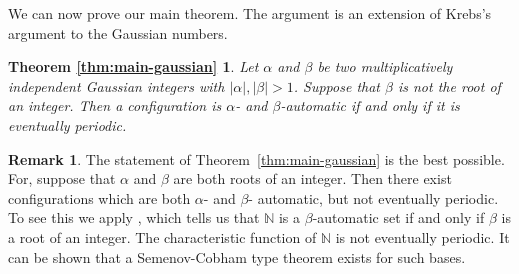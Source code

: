 \documentclass{amsart}
\newtheorem*{main theorem}{Theorem \ref{thm:main-gaussian}}
\theoremstyle{definition}
\newtheorem{remark}[theorem]{Remark}
\begin{document}
We can now prove our main theorem. The argument is an  extension of Krebs's argument \cite{Krebs} to the Gaussian numbers.
\begin{main theorem}
Let $\alpha$ and $\beta$ be two multiplicatively independent Gaussian integers with $|\alpha|, |\beta|>1$. Suppose that 
 $\beta$ is not the root of an integer.
Then a configuration is  $\alpha$- and $\beta$-automatic if and only if  it is eventually periodic. 
\end{main theorem}

\begin{remark}\label{rem:best}
The statement of Theorem~\ref{thm:main-gaussian} is the best possible. For,
suppose that $\alpha$ and $\beta$  are both roots of an integer. Then there exist configurations which are both $\alpha$-
 and $\beta$- automatic, but not eventually periodic. To see this we apply \cite[Theorem 4]{Bosma-Fokkink-Krebs}, which tells us that $\mathbb N$ is a
 $\beta$-automatic set if and only if $\beta$ is a root of an integer. The characteristic function of $\mathbb N$ is not eventually periodic. 
   It can be shown that a Semenov-Cobham type theorem exists for such bases.\end{remark}
\end{document}
